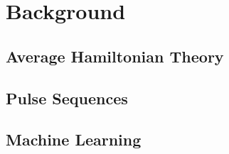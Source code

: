 \chapter{Background}

\section{Average Hamiltonian Theory}


\section{Pulse Sequences}


\section{Machine Learning}

